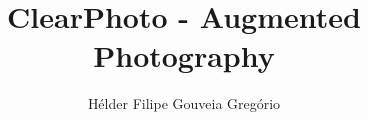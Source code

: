 \documentclass[prepmsc,en,
twoside,11pt,utf8,a4paper
]{thesisdifctunl}
\title{ClearPhoto - Augmented Photography}
\author[m]{Hélder Filipe Gouveia Gregório}
\begin{document}
\frontmatter

\frontpage

\printcopyright

\printdedicatory

\printacknowledgements

\printquote

\printabstract

\tableofcontents 

\printotherlists 

\printchapthers

\printbib

\printappendixes 

\end{document}
